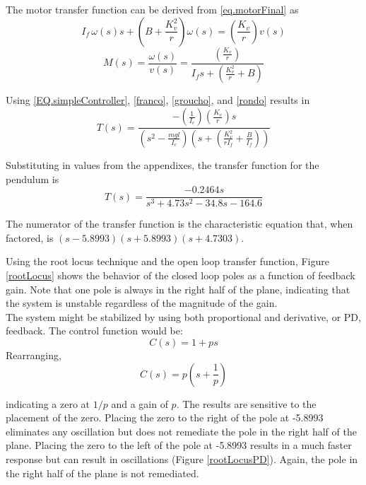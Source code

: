 \documentclass[12pt,letterpaper]{article}
\begin{document}
The motor transfer function can be derived from \eqref{eq.motorFinal} as
\begin{equation}
    I_{f} \, \omega(s) s + \left( B+\frac{K_{v}^2}{r} \right) \omega(s) = \left(\frac{K_{v}} {r}\right)v(s)
\end{equation}
%
\begin{equation}
    M(s) = \frac{\omega(s)}{v(s)} =  \frac{\left(\frac{K_{v}} {r}\right)}{I_{f} s + (\frac{K_{v}^2}{r}+B)}
    \label{rondo}
\end{equation} 

Using \eqref{EQ.simpleController}, \eqref{franco}, \eqref{groucho}, and \eqref{rondo} results in 
%
\begin{equation}
	T(s) =\frac{-(\frac{1} {I_{c}})(\frac{K_{v}}{r})s}
	{(s^2-\frac{m g l}{I_{c}})(s+(\frac{K_{v}^2}{r I_{f}}+\frac{B}{I_{f}}))}
\end{equation}

Substituting in values from the appendixes, the transfer function for the pendulum is
\begin{equation}
	T(s) =\frac{-0.2464 s}{s^3 + 4.73 s^2 -34.8 s -164.6}
\end{equation}

The numerator of the transfer function is the characteristic equation that, when factored, is
$(s-5.8993) (s+5.8993) (s+4.7303)$.

Using the root locus technique and the open loop transfer function, Figure \ref{rootLocus} shows the
behavior of the closed loop poles as a function of feedback gain.  Note that one pole is always in the right
half of the plane, indicating that the system is unstable regardless of the magnitude of the gain. \\


The system might be stabilized by using both proportional and derivative, or PD, feedback.  The control function would be:
\begin{equation}
	C(s) = 1 + p s
\end{equation}
Rearranging,
\begin{equation}
	C(s) = p\left(s+\frac{1}{p}\right)\label{pd}
\end{equation}

indicating a zero at $1/p$ and a gain of $p$.
The results are sensitive to the placement of the zero.  Placing the zero to the right of the pole at -5.8993 
eliminates any oscillation but does not remediate the pole in the right half of the plane.  Placing the zero to the left of the pole at -5.8993 results in a much faster response but can result in oscillations (Figure \ref{rootLocusPD}).  Again, the pole in the right half of the plane is not remediated. \\
\end{document}

